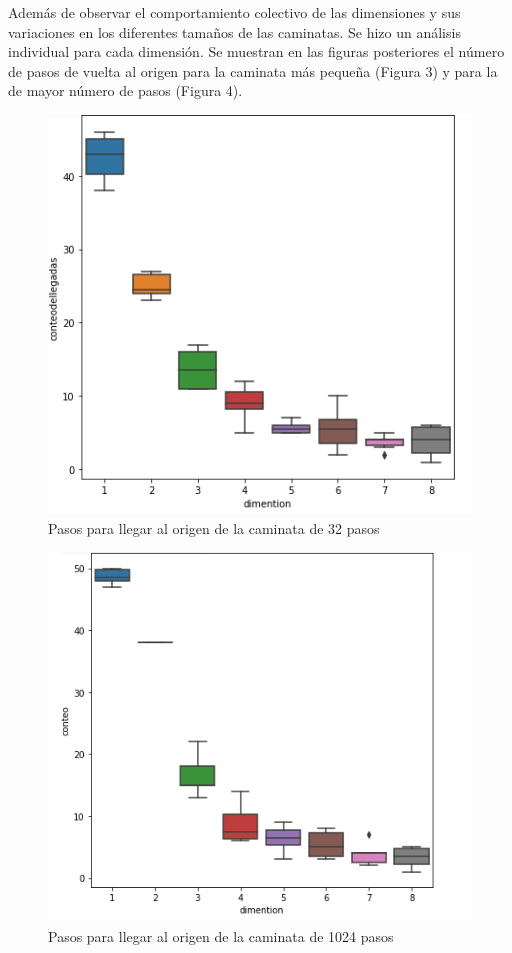\documentclass{article}
\begin{document}
Además de observar el comportamiento colectivo de las dimensiones y sus variaciones en los diferentes tamaños de las caminatas. Se hizo un análisis individual para cada dimensión. Se muestran en las figuras posteriores el número de pasos de vuelta al origen para la caminata más pequeña (Figura 3) y para la de mayor número de pasos (Figura 4).

\begin{figure}[H]
	\centering
	
	\includegraphics[scale=0.5]{Llegadapasos32.png}
	\caption{Pasos para llegar al origen de la caminata de 32 pasos}
	\label{fig:f3}
\end{figure}

\begin{figure}[H]
	\centering
	
	\includegraphics[scale=0.5]{Llegadadepasos1024.png}
	\caption{Pasos para llegar al origen de la caminata de 1024 pasos}
	\label{fig:f4}
\end{figure}
 
\end{document}
